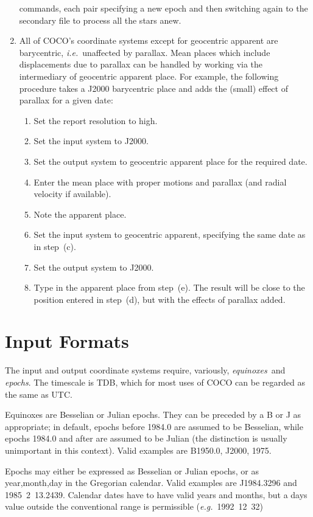 \begin{enumerate}
commands, each pair specifying a new epoch and then switching again
to the secondary file to process all the stars anew.
\item All of COCO's coordinate systems except for geocentric apparent
are barycentric, {\it i.e.}\ unaffected by parallax.
Mean places which include displacements
due to parallax can be handled by working
via the intermediary of geocentric
apparent place.  For example, the following procedure takes a J2000
barycentric place and adds the (small) effect of parallax for a
given date:
\begin{enumerate}
\item Set the report resolution to high.
\item Set the input system to J2000.
\item Set the output system to geocentric apparent place for
      the required date.
\item Enter the mean place with proper motions and parallax (and radial
      velocity if available).
\item Note the apparent place.
\item Set the input system to geocentric apparent, specifying the
      same date as in step~(c).
\item Set the output system to J2000.
\item Type in the apparent place from step~(e).  The result will be close
      to the position entered in step~(d), but with the effects of parallax
      added.
\end{enumerate}
\end{enumerate}

\section{Input Formats}

The input and output coordinate systems require, variously,
{\it equinoxes}\, and {\it epochs}. The timescale is TDB, which
for most uses of COCO can be regarded as the same as UTC.

Equinoxes are Besselian or Julian epochs.
They can be preceded by a B or J as appropriate; in default,
epochs before 1984.0 are assumed to be Besselian, while epochs
1984.0 and after are assumed to be Julian (the distinction is
usually unimportant in this context).
Valid examples are B1950.0, J2000, 1975.

Epochs may either be expressed as Besselian or Julian epochs,
or as year,month,day in the Gregorian calendar.
Valid examples are J1984.3296 and 1985~2~13.2439.
Calendar dates have to have valid years and months, but a days
value outside the
conventional range is permissible ({\it e.g.}~1992~12~32)

